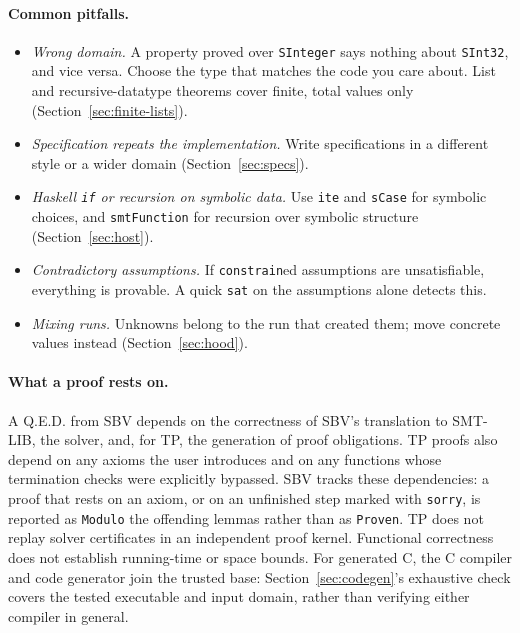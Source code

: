 \documentclass[review]{jfp-epi}
\newcommand{\code}[1]{\texttt{#1}}
\begin{document}
\paragraph{Common pitfalls.}
\begin{itemize}
\item \emph{Wrong domain.} A property proved over \code{SInteger} says nothing
  about \code{SInt32}, and vice versa. Choose the type that matches the code you
  care about. List and recursive-datatype theorems cover finite, total values only
  (Section~\ref{sec:finite-lists}).
\item \emph{Specification repeats the implementation.} Write specifications in a
  different style or a wider domain (Section~\ref{sec:specs}).
\item \emph{Haskell \code{if} or recursion on symbolic data.} Use \code{ite} and
  \code{sCase} for symbolic choices, and \code{smtFunction} for recursion over
  symbolic structure (Section~\ref{sec:host}).
\item \emph{Contradictory assumptions.} If \code{constrain}ed assumptions are
  unsatisfiable, everything is provable. A quick \code{sat} on the assumptions
  alone detects this.
\item \emph{Mixing runs.} Unknowns belong to the run that created
them; move concrete values instead (Section~\ref{sec:hood}).
\end{itemize}

\paragraph{What a proof rests on.}
A Q.E.D. from SBV depends on the correctness of SBV's translation to SMT-LIB, the
solver, and, for TP, the generation of proof obligations. TP proofs also depend on
any axioms the user introduces and on any functions whose termination checks
were explicitly bypassed. SBV tracks these dependencies: a proof that rests on an
axiom, or on an unfinished step marked with \code{sorry}, is reported as
\code{Modulo} the offending lemmas rather than as \code{Proven}. TP does not replay solver certificates in an independent proof
kernel. Functional correctness does not establish running-time or space bounds.
For generated C, the C compiler and code generator join the trusted base:
Section~\ref{sec:codegen}'s exhaustive check covers the tested executable and
input domain, rather than verifying either compiler in general.

\end{document}
